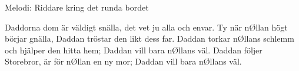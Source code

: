 \begin{song}

\begin{songmeta}
Melodi: Riddare kring det runda bordet
\end{songmeta}

\begin{songtext}
Daddorna dom är väldigt snälla,
det vet ju alla och envar.
Ty när nØllan högt börjar gnälla,
Daddan tröstar den likt dess far.
Daddan torkar nØllans schlemm
och hjälper den hitta hem;
Daddan vill bara nØllans väl.
Daddan följer Storebror,
är för nØllan en ny mor;
Daddan vill bara nØllans väl.
\end{songtext}
\end{song}
